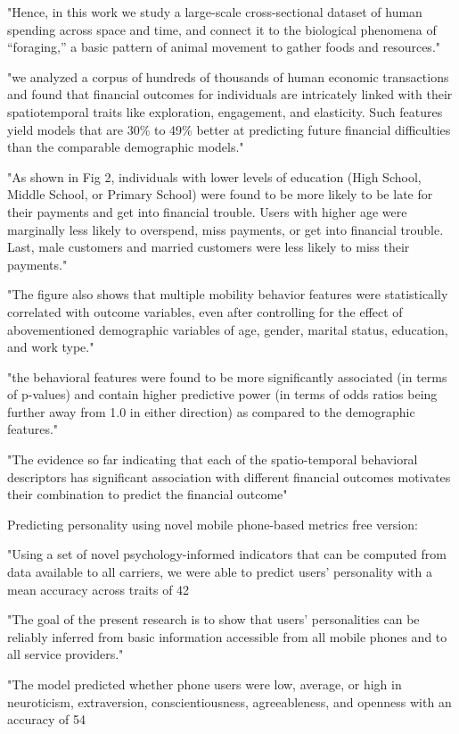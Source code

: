 "Hence, in this work we study a large-scale cross-sectional dataset of human spending across space and time, and connect it to the biological phenomena of “foraging,” a basic pattern of animal movement to gather foods and resources."

"we analyzed a corpus of hundreds of thousands of human economic transactions and found that financial outcomes for individuals are intricately linked with their spatiotemporal traits like exploration, engagement, and elasticity. Such features yield models that are 30\% to 49\% better at predicting future financial difficulties than the comparable demographic models."

"As shown in Fig 2, individuals with lower levels of education (High School, Middle School, or Primary School) were found to be more likely to be late for their payments and get into financial trouble. Users with higher age were marginally less likely to overspend, miss payments, or get into financial trouble. Last, male customers and married customers were less likely to miss their payments."

"The figure also shows that multiple mobility behavior features were statistically correlated with outcome variables, even after controlling for the effect of abovementioned demographic variables of age, gender, marital status, education, and work type."

"the behavioral features were found to be more significantly associated (in terms of p-values) and contain higher predictive power (in terms of odds ratios being further away from 1.0 in either direction) as compared to the demographic features."

"The evidence so far indicating that each of the spatio-temporal behavioral descriptors has significant association with different financial outcomes motivates their combination to predict the financial outcome"




Predicting personality using novel mobile phone-based metrics
free version:

"Using a set of novel psychology-informed indicators that can be computed from data available to all carriers, we were able to predict users’ personality with a mean accuracy across traits of 42%

"The goal of the present research is to show that users’ personalities can be reliably inferred from basic information accessible from all mobile phones and to all service providers."

"The model predicted whether phone users were low, average, or high in neuroticism, extraversion, conscientiousness, agreeableness, and openness with an accuracy of 54%
